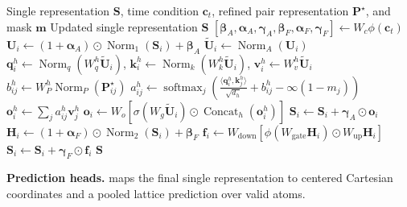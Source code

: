 \begin{algorithm}[H]
\caption{Pair-biased DiT block}
\label{alg:dit-block}
\begin{algorithmic}[1]
\Require Single representation $\mathbf S$, time condition $\mathbf c_t$,
refined pair representation $\mathbf P^\star$, and mask $\mathbf m$
\Ensure Updated single representation $\mathbf S$
\Statex $\displaystyle
[\boldsymbol\beta_A,\boldsymbol\alpha_A,\boldsymbol\gamma_A,
  \boldsymbol\beta_F,\boldsymbol\alpha_F,\boldsymbol\gamma_F]
\gets W_c\phi(\mathbf c_t)$
\State $\mathbf U_i\gets
    (1+\boldsymbol\alpha_A)\odot\operatorname{Norm}_1(\mathbf S_i)
    +\boldsymbol\beta_A$
\State $\widetilde{\mathbf U}_i\gets\operatorname{Norm}_A(\mathbf U_i)$
\Statex
{}
\State $\mathbf q_i^h\gets
    \operatorname{Norm}_q(W_q^h\widetilde{\mathbf U}_i)$,
    $\mathbf k_i^h\gets
    \operatorname{Norm}_k(W_k^h\widetilde{\mathbf U}_i)$,
    $\mathbf v_i^h\gets W_v^h\widetilde{\mathbf U}_i$
\State $b_{ij}^h\gets W_P^h
    \operatorname{Norm}_P(\mathbf P_{ij}^\star)$
\Statex $\displaystyle
a_{ij}^h\gets\operatorname{softmax}_{j}\!\left(
\frac{\langle\mathbf q_i^h,\mathbf k_j^h\rangle}{\sqrt{d_h}}
+b_{ij}^h-\infty(1-m_j)\right)$
\State $\mathbf o_i^h\gets\sum_j a_{ij}^h\mathbf v_j^h$
\Statex $\displaystyle
\mathbf o_i\gets W_o\!\left[
\sigma(W_g\widetilde{\mathbf U}_i)
\odot\operatorname{Concat}_h(\mathbf o_i^h)\right]$
\State $\mathbf S_i\gets
    \mathbf S_i+\boldsymbol\gamma_A\odot\mathbf o_i$
\Statex
{}
\State $\mathbf H_i\gets
    (1+\boldsymbol\alpha_F)\odot\operatorname{Norm}_2(\mathbf S_i)
    +\boldsymbol\beta_F$
\Statex $\displaystyle
\mathbf f_i\gets W_{\mathrm{down}}\!\left[
\phi(W_{\mathrm{gate}}\mathbf H_i)
\odot W_{\mathrm{up}}\mathbf H_i\right]$
\State $\mathbf S_i\gets
    \mathbf S_i+\boldsymbol\gamma_F\odot\mathbf f_i$
\State \Return $\mathbf S$
\end{algorithmic}
\end{algorithm}

\textbf{Prediction heads.}  maps the final single representation to centered Cartesian coordinates and a pooled lattice prediction over valid atoms.

